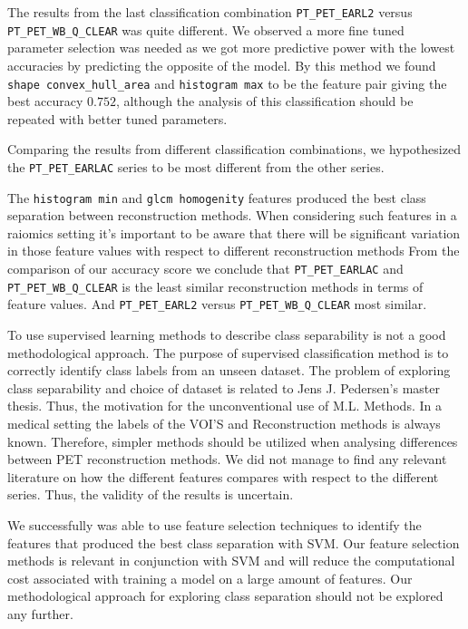 The results from the last classification combination
 \verb|PT_PET_EARL2| versus \verb|PT_PET_WB_Q_CLEAR| was quite different. 
 We observed a more fine tuned 
 parameter selection was needed as we got more predictive power with the lowest accuracies by predicting the 
 opposite of the model. By this method we found \verb|shape convex_hull_area| and \verb|histogram max| 
 to be the feature pair giving the best accuracy $0.752$, although the analysis of this classification 
 should be repeated with better tuned parameters.  



 Comparing the results from different classification combinations, we hypothesized the \verb|PT_PET_EARLAC| 
 series to be most different from the other series. 



The \verb|histogram min| and \verb|glcm homogenity| features produced the best
class separation between reconstruction methods.     
When considering such features in a raiomics setting it's important to be
aware that there will be significant variation in those feature values with
respect to different reconstruction methods
From the comparison of our accuracy score we conclude that    
\verb|PT_PET_EARLAC| and \verb|PT_PET_WB_Q_CLEAR|
is the least similar reconstruction methods  in terms of feature values.   
And \verb|PT_PET_EARL2| versus \verb|PT_PET_WB_Q_CLEAR| most similar. 


To use supervised learning methods to describe class separability is not a
good methodological approach. The purpose of supervised classification
method is to correctly identify class labels from an unseen dataset.     
The problem of exploring class separability and choice of dataset is
related to Jens J. Pedersen's master thesis. Thus, the motivation for the 
unconventional use of M.L. Methods. In a medical setting the labels of the
VOI'S and Reconstruction methods is always known. Therefore, simpler methods
should be utilized when analysing differences between PET reconstruction
methods. We did not manage to find any relevant literature on how the different features compares
with respect to the different series. Thus, the validity of the results is
uncertain. 

We successfully was able to use feature selection techniques to identify the
features that produced the best class separation with SVM.     
Our feature selection methods is relevant in conjunction with SVM and
will reduce the computational cost associated with training a model on a large
amount of features. Our methodological approach for exploring class separation
should not be explored any further. 
 




% 

